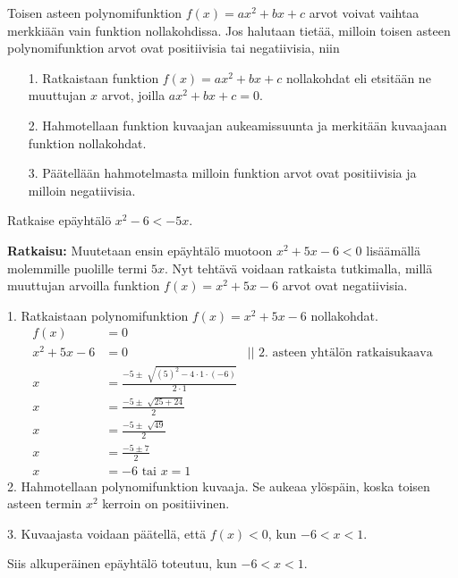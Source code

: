 Toisen asteen polynomifunktion $f(x)=ax^2+bx+c$ arvot voivat vaihtaa merkkiään vain funktion nollakohdissa. Jos halutaan tietää, milloin toisen asteen polynomifunktion arvot ovat positiivisia tai negatiivisia, niin
\begin{itemize}
\item[1.] Ratkaistaan funktion $f(x)=ax^2+bx+c$ nollakohdat eli etsitään ne muuttujan $x$ arvot, joilla $ax^2+bx+c=0$.
\item[2.] Hahmotellaan funktion kuvaajan aukeamissuunta ja merkitään kuvaajaan funktion nollakohdat.
\item[3.] Päätellään hahmotelmasta milloin funktion arvot ovat positiivisia ja milloin negatiivisia.
\end{itemize} 


\begin{esimerkki} 
Ratkaise epäyhtälö $x^2-6<-5x$.
 
\textbf{Ratkaisu:}
Muutetaan ensin epäyhtälö muotoon $x^2+5x-6<0$ lisäämällä molemmille puolille termi $5x$. Nyt tehtävä voidaan ratkaista tutkimalla, millä muuttujan arvoilla funktion $f(x)=x^2+5x-6$ arvot ovat negatiivisia.
 
1. Ratkaistaan polynomifunktion $f(x)=x^2+5x-6$ nollakohdat.
\begin{align*}
f(x)&=0 & \\
x^2+5x-6&=0 \ \  \ \ \ & || \text{ 2. asteen yhtälön ratkaisukaava} \\ 
x&=\frac{-5 \pm \sqrt[]{(5)^2-4 \cdot 1 \cdot(-6)}}{2 \cdot 1} & \\
x&=\frac{-5 \pm \sqrt[]{25+24}}{2} & \\
x&=\frac{-5 \pm \sqrt[]{49}}{2} & \\
x&=\frac{-5 \pm 7}{2} & \\
x&=-6 \text{ tai } x=1 &
\end{align*}
2. Hahmotellaan polynomifunktion kuvaaja. Se aukeaa ylöspäin, koska toisen
asteen termin $x^2$ kerroin on positiivinen.
 
\begin{lukusuora}{-2.5}{2.5}{5}
\end{lukusuora}
 
3.  Kuvaajasta voidaan päätellä, että $f(x)<0$, kun $-6 < x < 1$.
 
Siis alkuperäinen epäyhtälö toteutuu, kun $-6 < x <1$.  
\end{esimerkki}

